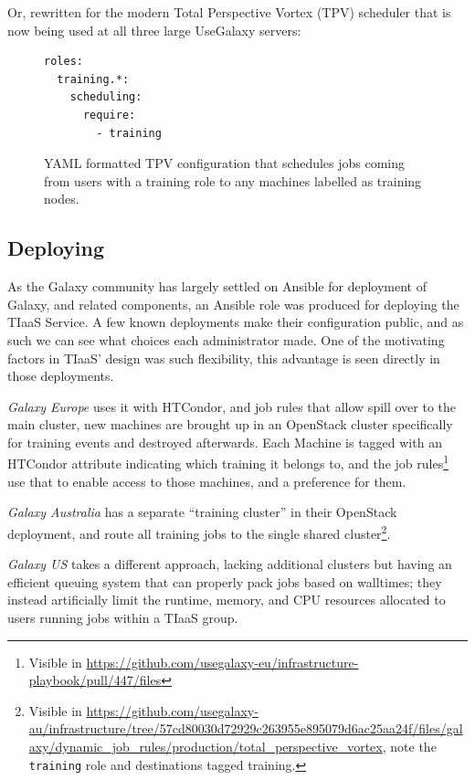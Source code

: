 \documentclass[a4paper,num-refs]{oup-contemporary}
\begin{document}
Or, rewritten for the modern Total Perspective Vortex (TPV)\cite{TPV} scheduler that is now being used at all three large UseGalaxy servers:

\begin{figure}[!ht]
\centering
\begin{lstlisting}[frame=single,language=bash]
roles:
  training.*:
    scheduling:
      require:
        - training
\end{lstlisting}
\caption{YAML formatted TPV configuration that schedules jobs coming from users with a training role to any machines labelled as training nodes.\label{code:tpv}}
\end{figure}

\subsection{Deploying}
As the Galaxy community has largely settled on Ansible for deployment of Galaxy, and related components, an Ansible role was produced for deploying the TIaaS Service. A few known deployments make their configuration public, and as such we can see what choices each administrator made. One of the motivating factors in TIaaS' design was such flexibility, this advantage is seen directly in those deployments.

\emph{Galaxy Europe} uses it with HTCondor, and job rules that allow spill over to the main cluster, new machines are brought up in an OpenStack cluster specifically for training events and destroyed afterwards. Each Machine is tagged with an HTCondor attribute indicating which training it belongs to, and the job rules\footnote{Visible in \url{https://github.com/usegalaxy-eu/infrastructure-playbook/pull/447/files}} use that to enable access to those machines, and a preference for them.

\emph{Galaxy Australia} has a separate ``training cluster'' in their OpenStack deployment, and route all training jobs to the single shared cluster\footnote{Visible in \url{https://github.com/usegalaxy-au/infrastructure/tree/57cd80030d72929c263955e895079d6ac25aa24f/files/galaxy/dynamic_job_rules/production/total_perspective_vortex}, note the \texttt{training} role and destinations tagged training.}.

\emph{Galaxy US} takes a different approach, lacking additional clusters but having an efficient queuing system that can properly pack jobs based on walltimes; they instead artificially limit the runtime, memory, and CPU resources allocated to users running jobs within a TIaaS group. 
\end{document}
